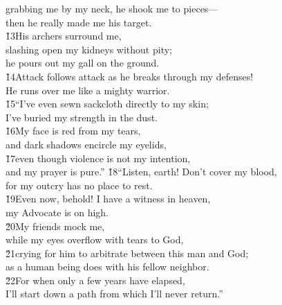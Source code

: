 \begin{poetry}
\poemll    grabbing me by my neck, he shook me to pieces--- \\
\poemlll       then he really made me his target. \\
\poeml \v{13}His archers surround me, \\
\poemll    slashing open my kidneys without pity; \\
\poemlll       he pours out my gall on the ground. \\
\poeml \v{14}Attack follows attack as he breaks through my defenses! \\
\poemll    He runs over me like a mighty warrior. \\
\poeml \v{15}``I've even sewn sackcloth directly to my skin; \\
\poemll    I've buried my strength in the dust. \\
\poeml \v{16}My face is red from my tears, \\
\poemll    and dark shadows encircle my eyelids, \\
\poeml \v{17}even though violence is not my intention, \\
\poemll    and my prayer is pure.''
\poeml \v{18}``Listen, earth! Don't cover my blood, \\
\poemll    for my outcry has no place to rest. \\
\poeml \v{19}Even now, behold! I have a witness in heaven, \\
\poemll    my Advocate is on high. \\
\poeml \v{20}My friends mock me, \\
\poemll    while my eyes overflow with tears to God, \\
\poeml \v{21}crying for him to arbitrate between this man and God; \\
\poemll    as a human being does with his fellow neighbor. \\
\poeml \v{22}For when only a few years have elapsed, \\
\poemll    I'll start down a path from which I'll never return.''
\end{poetry}

